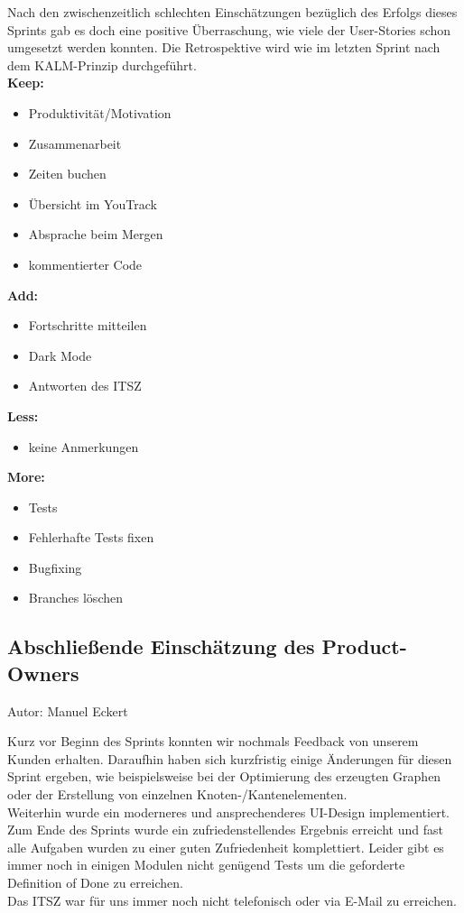 Nach den zwischenzeitlich schlechten Einschätzungen bezüglich des Erfolgs dieses Sprints gab es doch eine positive Überraschung, wie viele der User-Stories schon umgesetzt werden konnten. Die Retrospektive wird wie im letzten Sprint nach dem KALM-Prinzip durchgeführt.\\

\textbf{Keep:}
\begin{itemize}
\item Produktivität/Motivation
\item Zusammenarbeit 
\item Zeiten buchen
\item Übersicht im YouTrack
\item Absprache beim Mergen
\item kommentierter Code
\end{itemize}

\textbf{Add:}
\begin{itemize}
\item Fortschritte mitteilen
\item Dark Mode
\item Antworten des ITSZ
\end{itemize}

\textbf{Less:}
\begin{itemize}
\item keine Anmerkungen
\end{itemize}

\textbf{More:}
\begin{itemize}
\item Tests
\item Fehlerhafte Tests fixen
\item Bugfixing
\item Branches löschen
\end{itemize}


\subsection{Abschließende Einschätzung des Product-Owners}
{\small Autor: Manuel Eckert}

Kurz vor Beginn des Sprints konnten wir nochmals Feedback von unserem Kunden erhalten. Daraufhin haben sich kurzfristig einige Änderungen für diesen Sprint ergeben, wie beispielsweise bei der Optimierung des erzeugten Graphen oder der Erstellung von einzelnen Knoten-/Kantenelementen.\\
Weiterhin wurde ein moderneres und ansprechenderes UI-Design implementiert. \\
Zum Ende des Sprints wurde ein zufriedenstellendes Ergebnis erreicht und fast alle Aufgaben wurden zu einer guten Zufriedenheit komplettiert. 
Leider gibt es immer noch in einigen Modulen nicht genügend Tests um die geforderte Definition of Done zu erreichen. \\
Das ITSZ war für uns immer noch nicht telefonisch oder via E-Mail zu erreichen.

